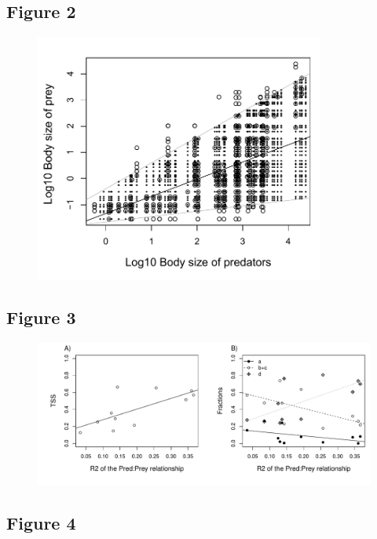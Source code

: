 \documentclass[12pt]{article}
\begin{document}
\newpage
\subsection*{Figure 2}

\begin{figure}[ht!]
	\centering\includegraphics[width=0.85\textwidth]{Example.pdf}
\end{figure}

\newpage
\subsection*{Figure 3}

\begin{figure}[ht!]
	\centering\includegraphics[width=1\textwidth]{TSS_perweb.pdf}
\end{figure}

\newpage
\subsection*{Figure 4}
\end{document}
